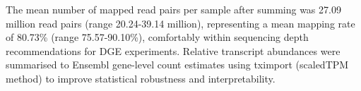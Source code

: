 %
%
The mean number of mapped read pairs per sample after summing was 27.09 million read pairs (range 20.24-39.14 million), representing a mean mapping rate of 80.73\% (range 75.57-90.10\%), comfortably within sequencing depth recommendations for \gls{DGE} experiments\autocite{liu2014RNAseqDifferentialExpression}.
Relative transcript abundances were summarised to Ensembl gene-level count estimates using tximport (scaledTPM method) to improve statistical robustness and interpretability\autocite{soneson2016DifferentialAnalysesRNAseq}.

